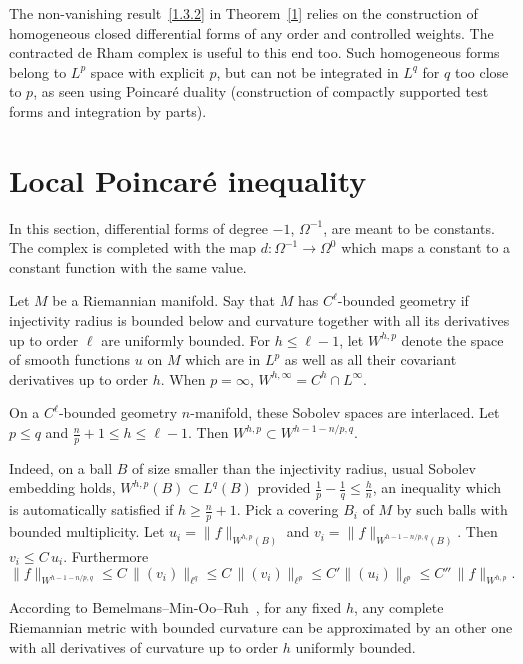 
The non-vanishing result~\eqref{1.3.2} in Theorem~\ref{1} relies on the construction of homogeneous closed differential forms of any order and controlled weights. The contracted de Rham complex is useful to this end too. Such homogeneous forms belong to $L^p$ space with explicit $p$, but can not be integrated in $L^q$ for $q$ too close to $p$, as seen using Poincar\'e duality (construction of compactly supported test forms and integration by parts).


\section{Local Poincar\'e inequality}

In this section, differential forms of degree $-1$, $\Omega^{-1}$, are meant to be constants. The complex is completed with the map $d:\Omega^{-1}\to\Omega^0$ which maps a constant to a constant function with the same value.

\begin{defi}
Let $M$ be a Riemannian manifold. Say that $M$ has $C^\ell$-bounded geometry if injectivity radius is bounded below and curvature together with all its derivatives up to order $\ell$ are uniformly bounded. For $h \leq \ell-1$, let $W^{h,p}$ denote the space of smooth functions $u$ on $M$ which are in $L^p$ as well as all their covariant derivatives up to order $h$. When $p=\infty$, $W^{h,\infty}=C^h\cap L^{\infty}$.
\end{defi}

\begin{rema}\label{whpdecr}
On a $C^\ell$-bounded geometry $n$-manifold, these Sobolev spaces are interlaced. Let $p \leq q$ and $\frac{n}{p} +1 \leq h \leq \ell-1$. Then $W^{h,p}\subset W^{h -1- n/p,q}$.
\end{rema}

Indeed, on a ball $B$ of size smaller than the injectivity radius, usual Sobolev embedding holds, $W^{h,p}(B)\subset L^q(B)$ provided $\frac{1}{p}-\frac{1}{q}\leq \frac{h}{n}$, an inequality which is automatically satisfied if $h\geq \frac{n}{p}+1$. Pick a covering $B_i$ of $M$ by such balls with bounded multiplicity. Let $u_i=\|f\|_{W^{h,p}(B)}$ and $v_i=\|f\|_{W^{h-1 -n/p,q}(B)}$. Then $v_i\leq C\,u_i$. Furthermore
\[
\|f\|_{W^{h-1 -n/p,q}}\leq C\,\|(v_i)\|_{\ell^q}\leq C\,\|(v_i)\|_{\ell^p}\leq C'
\|(u_i)\|_{\ell^p}\leq C''\,\|f\|_{W^{h,p}}.
\]

\begin{rema}
According to Bemelmans--Min-Oo--Ruh~\cite{B-MinOo-Ruh}, for any fixed $h$, any complete Riemannian metric with bounded curvature can be approximated by an other one with all derivatives of curvature up to order $h$ uniformly bounded.
\end{rema}

